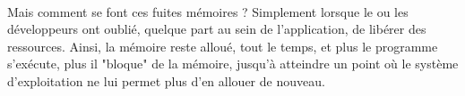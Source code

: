 {  \paragraph{} Mais comment se font ces fuites mémoires ? Simplement lorsque le ou les développeurs
  ont oublié, quelque part au sein de l'application, de libérer des ressources. Ainsi, la mémoire reste
  alloué, tout le temps, et plus le programme s'exécute, plus il "bloque" de la mémoire, jusqu'à atteindre
  un point où le système d'exploitation ne lui permet plus d'en allouer de nouveau.

}




